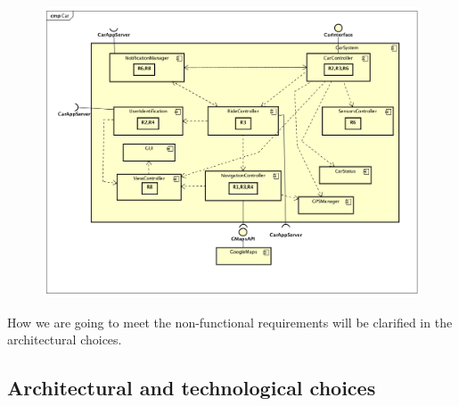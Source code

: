 \documentclass[]{article}
\begin{document}
\begin{figure}
\centering
\includegraphics[width=1.00000\textwidth,height=1.00000\textwidth]{./comp_diagrams/car_reqt.png}
\caption{}\label{id}
\end{figure}

How we are going to meet the non-functional requirements will be
clarified in the architectural choices.

\subsection{Architectural and technological
choices}\label{architectural-and-technological-choices}
\end{document}
